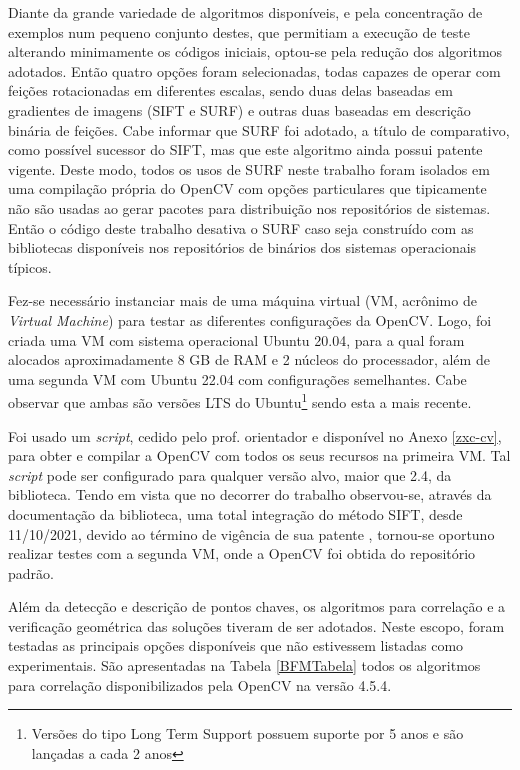 Diante da grande variedade de algoritmos disponíveis, e pela concentração de exemplos num pequeno conjunto destes, que permitiam a execução de teste alterando minimamente os códigos iniciais, optou-se pela redução dos algoritmos adotados. Então quatro opções foram selecionadas, todas capazes de operar com feições rotacionadas em diferentes escalas, sendo duas delas baseadas em gradientes de imagens (SIFT e SURF) e outras duas baseadas em descrição binária de feições. Cabe informar que SURF foi adotado, a título de comparativo, como possível sucessor do SIFT, mas que este algoritmo ainda possui patente vigente. Deste modo, todos os usos de SURF neste trabalho foram isolados em uma compilação própria do OpenCV com opções particulares que tipicamente não são usadas ao gerar pacotes para distribuição nos repositórios de sistemas. Então o código deste trabalho desativa o SURF caso seja construído com as bibliotecas disponíveis nos repositórios de binários dos sistemas operacionais típicos. 

Fez-se necessário instanciar mais de uma máquina virtual (VM, acrônimo de \textit{Virtual Machine}) para testar as diferentes configurações da OpenCV. Logo, foi criada uma VM com sistema operacional Ubuntu 20.04, para a qual foram alocados aproximadamente 8 GB de RAM e 2 núcleos do processador, além de uma segunda VM com Ubuntu 22.04 com configurações semelhantes. Cabe observar que ambas são versões LTS do Ubuntu\footnote{Versões do tipo Long Term Support possuem suporte por 5 anos e são lançadas a cada 2 anos} sendo esta a mais recente.

Foi usado um \textit{script}, cedido pelo prof. orientador e disponível no Anexo \ref{zxc-cv}, para obter e compilar a OpenCV com todos os seus recursos na primeira VM. Tal \textit{script} pode ser configurado para qualquer versão alvo, maior que 2.4, da biblioteca.
Tendo em vista que no decorrer do trabalho observou-se, através da documentação da biblioteca, uma total integração do método SIFT, desde 11/10/2021, devido ao término de vigência de sua patente \cite{SIFT_Patent}, tornou-se oportuno realizar testes com a segunda VM, onde a OpenCV foi obtida do repositório padrão.

Além da detecção e descrição de pontos chaves, os algoritmos para correlação e a verificação geométrica das soluções tiveram de ser adotados. Neste escopo, foram testadas as principais opções disponíveis que não estivessem listadas como experimentais. São apresentadas na Tabela \ref{BFMTabela} todos os algoritmos para correlação disponibilizados pela OpenCV na versão 4.5.4.

